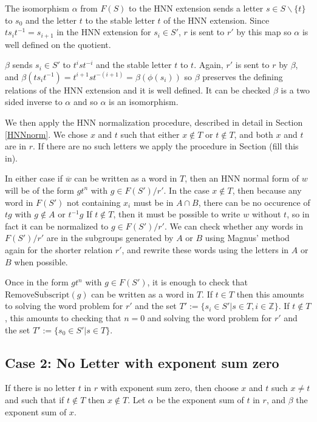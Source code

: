 \documentclass[11pt]{article} %
\theoremstyle{definition}
\theoremstyle{definition}
\theoremstyle{definition}
\theoremstyle{definition}
\theoremstyle{definition}
\theoremstyle{definition}
\begin{document}
The isomorphism $\alpha$ from $F(S)$ to the HNN extension sends a letter
$s \in S \backslash \{t\}$ to $s_0$ and
the letter $t$ to the stable letter $t$ of the HNN extension. Since $t s_i t^{-1} = s_{i+1}$ in
the HNN extension for $s_i \in S'$, $r$ is sent to $r'$ by this map so $\alpha$ is well defined
on the quotient.

$\beta$ sends $s_i \in S'$ to $t^{i} s t^{-i}$ and the stable letter $t$ to $t$.
Again, $r'$ is sent to $r$ by $\beta$, and $\beta (t s_i t^{-1}) = t^{i+1} s t^{-(i+1)} =
\beta (\phi (s_i))$ so $\beta$ preserves the defining relations of the HNN extension and it
is well defined. It can be checked $\beta$ is a two sided inverse to $\alpha$ and so $\alpha$
is an isomorphism.

We then apply the HNN normalization procedure, described in detail in Section \ref{HNNnorm}.
We chose $x$ and $t$ such that either $x \notin T$ or $t \notin T$, and both $x$ and $t$
are in $r$. If there are no such letters we apply the procedure in Section (fill this in).

In either case if $\overline{w}$ can be written as a word in $T$,
then an HNN normal form of $w$ will be of the form $g t^n$
with $g \in F(S') / r'$. In the case $x \notin T$, then because any word in
$F(S')$ not containing $x_i$ must be in $A \cap B$, there can be no occurence of
$tg$ with $g \notin A$ or $t^{-1}g$
If $t \notin T$, then it must be possible to write $w$ without $t$, so in fact it can be normalized
to $g \in F(S') / r'$. We can check whether any words in $F(S') / r'$ are in the subgroups
generated by $A$ or $B$ using
Magnus' method again for the shorter relation $r'$, and rewrite these words using the letters
in $A$ or $B$ when possible.

Once in the form $g t^n$ with $g \in F(S')$, it is enough to check that
$\overline{\text{RemoveSubscript}(g)}$ can be written as a word in $T$.
If $t \in T$ then this amounts to solving the word problem for $r'$
and the set $T' := \{ s_i \in S' | s \in T, i \in \mathbb{Z} \}$. If $t \notin T$,
this amounts to checking that $n = 0$ and solving the word problem for
$r'$ and the set $T' := \{s_0 \in S' | s \in T\}$.

\subsection{Case 2: No Letter with exponent sum zero}

If there is no letter $t$ in $r$ with exponent sum zero, then choose $x$
and $t$ such $x \ne t$ and such that if $t \notin T$ then $x \notin T$.
Let $\alpha$ be the exponent sum
of $t$ in $r$, and $\beta$ the exponent sum of $x$.
\end{document}
